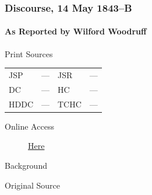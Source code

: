 		\subsubsection{Discourse, 14 May 1843--B}
			\label{EMS-1843-JS-14-MAY-1843-B}
			
			\paragraph{As Reported by Wilford Woodruff}
				\label{EMS-1843-JS-14-MAY-1843-B-WW}
			
				\begin{description}
					\item[Print Sources]
				\end{description}

					\begin{tabular}{p{0.5in}p{1in}p{0.5in}p{1in}}
					JSP	 	& ---		& JSR 		& --- \\
					DC	 	& ---		& HC 		& --- \\
					HDDC 	& ---		& TCHC 		& --- \\
					\end{tabular}
				
				\begin{description}
					\item[Online Access] \href{https://www.josephsmithpapers.org/paper-summary/remarks-14-may-1843-as-reported-by-wilford-woodruff/1}{Here}
				\end{description}
				
				\begin{description}
					\item[Background]
				\end{description}
				
				
				\begin{description}
					\item[Original Source]
				\end{description}
				
